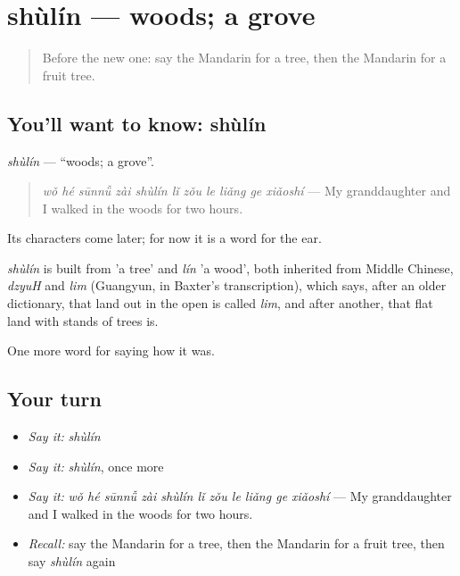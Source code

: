 \section[shùlín]{shùlín — woods; a grove}

\label{lesson:ZH-C516-shulin}



\begin{quote}
Before the new one: say the Mandarin for a tree, then the Mandarin for a fruit tree.
\end{quote}

\subsection*{You'll want to know: shùlín}
\emph{shùlín} — \textquotedblleft{}woods; a grove\textquotedblright{}.

\begin{quote}
\emph{wǒ hé sūnnǚ zài shùlín lǐ zǒu le liǎng ge xiǎoshí} — My granddaughter and I walked in the woods for two hours.
\end{quote}

Its characters come later; for now it is a word for the ear.

\begin{cousinweb}
\emph{shùlín} is built from  'a tree' and \emph{lín} 'a wood', both inherited from Middle Chinese, \emph{dzyuH} and \emph{lim} (Guangyun, in Baxter's transcription), which says, after an older dictionary, that land out in the open is called \emph{lim}, and after another, that flat land with stands of trees is.
\end{cousinweb}

\begin{grammarlens}[title={What you've built}]
One more word for saying how it was.
\end{grammarlens}

\subsection*{Your turn}
\begin{itemize}
\raggedright
  \item \emph{Say it:} \emph{shùlín}
  \item \emph{Say it:} \emph{shùlín}, once more
  \item \emph{Say it:} \emph{wǒ hé sūnnǚ zài shùlín lǐ zǒu le liǎng ge xiǎoshí} — My granddaughter and I walked in the woods for two hours.
  \item \emph{Recall:} say the Mandarin for a tree, then the Mandarin for a fruit tree, then say \emph{shùlín} again
\end{itemize}

